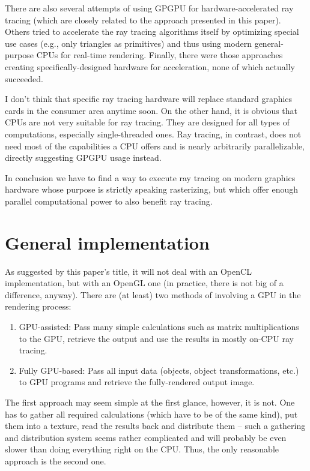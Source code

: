 \documentclass[english,fleqn,10pt,twocolumn]{article}
\begin{document}
There are also several attempts of using GPGPU for hardware-accelerated ray tracing (which are closely related to the approach presented in this paper). Others tried to accelerate the ray tracing algorithms itself by optimizing special
use cases (e.g., only triangles as primitives) and thus using modern general-purpose CPUs for real-time rendering. Finally, there were those approaches creating specifically-designed hardware for acceleration, none of which actually
succeeded.

I don't think that specific ray tracing hardware will replace standard graphics cards in the consumer area anytime soon. On the other hand, it is obvious that CPUs are not very suitable for ray tracing. They are designed for all types of
computations, especially single-threaded ones. Ray tracing, in contrast, does not need most of the capabilities a CPU offers and is nearly arbitrarily parallelizable, directly suggesting GPGPU usage instead.

In conclusion we have to find a way to execute ray tracing on modern graphics hardware whose purpose is strictly speaking rasterizing, but which offer enough parallel computational power to also benefit ray tracing.


\section{General implementation}

As suggested by this paper's title, it will not deal with an OpenCL implementation, but with an OpenGL one (in practice, there is not big of a difference, anyway). There are (at least) two methods of involving a GPU in the rendering
process:
\begin{enumerate}
    \item GPU-assisted: Pass many simple calculations such as matrix multiplications to the GPU, retrieve the output and use the results in mostly on-CPU ray tracing.
    \item Fully GPU-based: Pass all input data (objects, object transformations, etc.) to GPU programs and retrieve the fully-rendered output image.
\end{enumerate}

The first approach may seem simple at the first glance, however, it is not. One has to gather all required calculations (which have to be of the same kind), put them into a texture, read the results back and distribute them -- such a
gathering and distribution system seems rather complicated and will probably be even slower than doing everything right on the CPU. Thus, the only reasonable approach is the second one.
\end{document}
